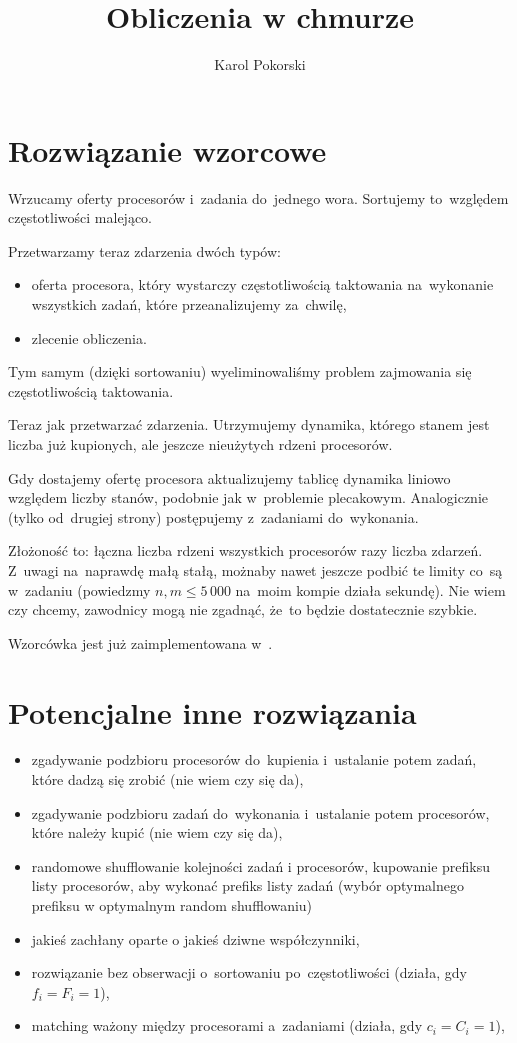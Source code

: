 \documentclass[opr,utf8]{sinol}
\title{Obliczenia w chmurze}
\author{Karol Pokorski} %
\begin{document}
  \begin{tasktext}%

  \section{Rozwiązanie wzorcowe}
    Wrzucamy oferty procesorów i~zadania do~jednego wora.
    Sortujemy to~względem częstotliwości malejąco.

    Przetwarzamy teraz zdarzenia dwóch typów:
    \begin{itemize}
      \item oferta procesora, który wystarczy częstotliwością taktowania
      na~wykonanie wszystkich zadań, które przeanalizujemy za~chwilę,
      \item zlecenie obliczenia.
    \end{itemize}
    Tym samym (dzięki sortowaniu) wyeliminowaliśmy problem zajmowania się
    częstotliwością taktowania.

    Teraz jak przetwarzać zdarzenia.
    Utrzymujemy dynamika, którego stanem jest liczba już kupionych, ale jeszcze
    nieużytych rdzeni procesorów.

    Gdy dostajemy ofertę procesora aktualizujemy tablicę dynamika liniowo względem
    liczby stanów, podobnie jak w~problemie plecakowym.
    Analogicznie (tylko od~drugiej strony) postępujemy z~zadaniami do~wykonania.

    Złożoność to: łączna liczba rdzeni wszystkich procesorów razy liczba zdarzeń.
    Z~uwagi na~naprawdę małą stałą, możnaby nawet jeszcze podbić te limity
    co~są w~zadaniu (powiedzmy $n, m \le 5\,000$ na~moim kompie działa sekundę).
    Nie wiem czy chcemy, zawodnicy mogą nie zgadnąć, że~to będzie dostatecznie
    szybkie.

    Wzorcówka jest już zaimplementowana w~.

  \section{Potencjalne inne rozwiązania}
    \begin{itemize}
      \item zgadywanie podzbioru procesorów do~kupienia i~ustalanie potem
      zadań, które dadzą się zrobić (nie wiem czy się da),
      \item zgadywanie podzbioru zadań do~wykonania i~ustalanie potem
      procesorów, które należy kupić (nie wiem czy się da),
      \item randomowe shufflowanie kolejności zadań i procesorów, kupowanie
      prefiksu listy procesorów, aby wykonać prefiks listy zadań (wybór optymalnego
      prefiksu w optymalnym random shufflowaniu)
      \item jakieś zachłany oparte o jakieś dziwne współczynniki,
      \item rozwiązanie bez obserwacji o~sortowaniu po~częstotliwości (działa, gdy $f_i = F_i = 1$),
      \item matching ważony między procesorami a~zadaniami (działa, gdy $c_i = C_i = 1$),
    \end{itemize}


\end{tasktext}
\end{document}
